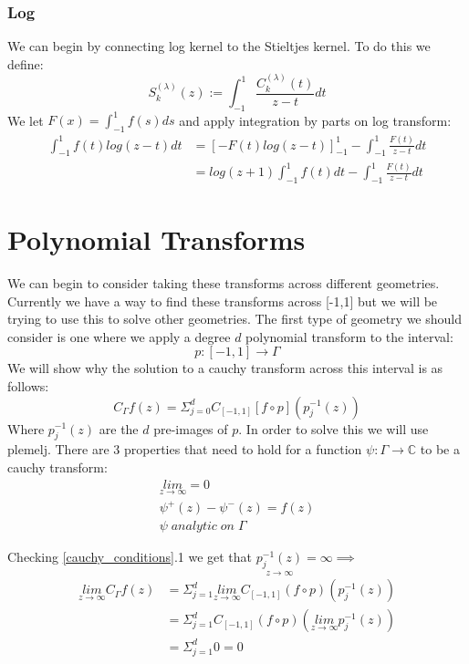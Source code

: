 \documentclass{article}
\begin{document}
\subsubsection*{Log}
We can begin by connecting log kernel to the Stieltjes kernel. To do this we define:$$S_k^{(\lambda)}(z):=\int_{-1}^{1}\frac{C_k^{(\lambda)}(t)}{z-t}dt$$
We let $F(x) = \int_{-1}^1f(s)ds$ and apply integration by parts on log transform:
\begin{equation}
\begin{split}
	\int_{-1}^1f(t)log(z-t)dt &= [-F(t)log(z-t)]_{-1}^1-\int_{-1}^1\frac{F(t)}{z-t}dt \\
	&= log(z+1)\int_{-1}^1f(t)dt-\int_{-1}^1\frac{F(t)}{z-t}dt
\end{split}
\end{equation}

\section{Polynomial Transforms}
We can begin to consider taking these transforms across different geometries.
Currently we have a way to find these transforms across [-1,1] but we will be trying to use this to solve other geometries.
The first type of geometry we should consider is one where we apply a degree $d$ polynomial transform to the interval:
$$p:[-1,1]\rightarrow \Gamma$$
We will show why the solution to a cauchy transform across this interval is as follows:
\begin{equation}
C_\Gamma f(z) = \Sigma_{j=0}^dC_{[-1,1]}[f\circ p](p_j^{-1}(z))
\end{equation}
Where $p_j^{-1}(z)$ are the $d$ pre-images of $p$.
In order to solve this we will use plemelj.
There are 3 properties that need to hold for a function $\psi: \Gamma \rightarrow \mathbb{C}$ to be a cauchy transform:
\begin{equation}\label{cauchy_conditions}\begin{gathered}
\underset{z\to\infty}{lim}= 0 \\
\psi^+(z)-\psi^-(z)= f(z) \\
\psi\;analytic\;on\;\Gamma 
\end{gathered}\end{equation}

Checking \eqref{cauchy_conditions}.1 we get that $\underset{z\to\infty}{p_j^{-1}(z)} = \infty \implies$
\begin{equation}\begin{split}
\underset{z\to\infty}{lim}C_\Gamma f(z) &= \Sigma_{j=1}^d \underset{z\to\infty}{lim}C_{[-1,1]}(f\circ p)(p_j^{-1}(z)) \\
&= \Sigma_{j=1}^d C_{[-1,1]}(f\circ p)(\underset{z\to\infty}{lim} p_j^{-1}(z)) \\
&= \Sigma_{j=1}^d 0 = 0
\end{split}\end{equation}
\end{document}
